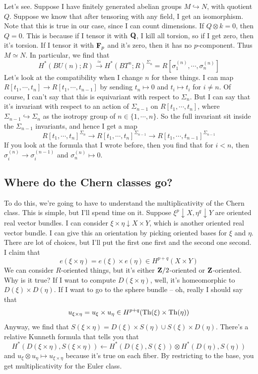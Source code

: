 Let's see.
Suppose I have finitely generated abelian groups $M\hookrightarrow N$, with quotient $Q$.
Suppose we know that after tensoring with any field, I get an isomorphism.
Note that this is true in our case, since I can count dimensions.
If $Q\otimes k = 0$, then $Q = 0$.
This is because if I tensor it with $\mathbf Q$, I kill all torsion, so if I get zero, then it's torsion.
If I tensor it with $\mathbf F_p$ and it's zero, then it has no $p$-component.
Thus $M\simeq N$.
In particular, we find that
$$
H^\ast(BU(n);R) \xrightarrow{\simeq} H^\ast(BT^n;R)^{\Sigma_n} = R[\sigma_1^{(n)},\cdots,\sigma_n^{(n)}]
$$
Let's look at the compatibility when I change $n$ for these things.
I can map $R[t_1,\cdots,t_n] \to R[t_1,\cdots,t_{n-1}]$ by sending $t_n\mapsto 0$ and $t_i\mapsto t_i$ for $i\neq n$.
Of course, I can't say that this is equivariant with respect to $\Sigma_n$.
But I can say that it's invariant with respect to an action of $\Sigma_{n-1}$ on $R[t_1,\cdots,t_n]$, where $\Sigma_{n-1}\hookrightarrow \Sigma_n$ as the isotropy group of $n\in\{1,\cdots,n\}$.
So the full invariant sit inside the $\Sigma_{n-1}$ invariants, and hence I get a map
$$
R[t_1,\cdots,t_n]^{\Sigma_n} \to R[t_1,\cdots,t_n]^{\Sigma_{n-1}} \to R[t_1,\cdots,t_{n-1}]^{\Sigma_{n-1}}
$$
If you look at the formula that I wrote before, then you find that for $i<n$, then $\sigma_i^{(n)} \to \sigma_i^{(n-1)}$ and $\sigma_n^{(n)} \mapsto 0$.
\subsection{Where do the Chern classes go?}
To do this, we're going to have to understand the multiplicativity of the Chern class.
This is simple, but I'll spend time on it.
Suppose $\xi^p\downarrow X,\eta^q\downarrow Y$ are oriented real vector bundles.
I can consider $\xi\times\eta\downarrow X\times Y$, which is another oriented real vector bundle.
I can give this an orientation by picking oriented bases for $\xi$ and $\eta$.
There are lot of choices, but I'll put the first one first and the second one second.
I claim that
$$
e(\xi\times\eta) = e(\xi)\times e(\eta) \in H^{p+q}(X\times Y)
$$
We can consider $R$-oriented things, but it's either $\mathbf Z/2$-oriented or $\mathbf Z$-oriented.
Why is it true?
If I want to compute $D(\xi\times\eta)$, well, it's homeomorphic to $D(\xi)\times D(\eta)$.
If I want to go to the sphere bundle -- oh, really I should say that
$$
u_{\xi\times \eta} = u_\xi\times u_\eta\in H^{p+q}(\operatorname{Th}(\xi)\times\operatorname{Th}(\eta))
$$
Anyway, we find that $S(\xi\times\eta) = D(\xi)\times S(\eta)\cup S(\xi)\times D(\eta)$.
There's a relative Kunneth formula that tells you that
$$
H^\ast(D(\xi\times\eta),S(\xi\times\eta)) \leftarrow H^\ast(D(\xi),S(\xi))\otimes H^\ast(D(\eta),S(\eta))
$$
and $u_\xi\otimes u_\eta\mapsto u_{\xi\times\eta}$ because it's true on each fiber.
By restricting to the base, you get multiplicativity for the Euler class.


